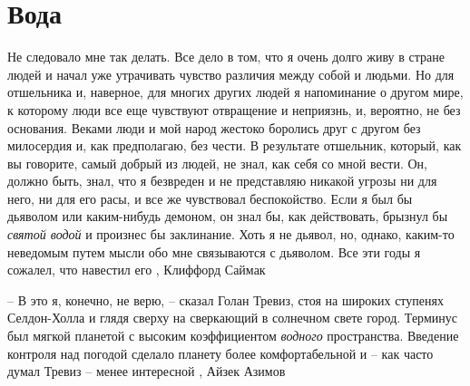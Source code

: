  
 
 
 
 
\chapter{Вода}

Не следовало мне так делать. Все дело в том, что я очень долго живу в стране
людей и начал уже утрачивать чувство различия между собой и людьми. Но для
отшельника и, наверное, для многих других людей я напоминание о другом мире, к
которому люди все еще чувствуют отвращение и неприязнь, и, вероятно, не без
основания. Веками люди и мой народ жестоко боролись друг с другом без
милосердия и, как предполагаю, без чести. В результате отшельник, который, как
вы говорите, самый добрый из людей, не знал, как себя со мной вести. Он, должно
быть, знал, что я безвреден и не представляю никакой угрозы ни для него, ни для
его расы, и все же чувствовал беспокойство. Если я был бы дьяволом или
каким-нибудь демоном, он знал бы, как действовать, брызнул бы \emph{святой водой} и
произнес бы заклинание. Хоть я не дьявол, но, однако, каким-то неведомым путем
мысли обо мне связываются с дьяволом. Все эти годы я сожалел, что навестил его
, Клиффорд Саймак

– В это я, конечно, не верю, – сказал Голан Тревиз, стоя на широких ступенях
Селдон-Холла и глядя сверху на сверкающий в солнечном свете город.  Терминус
был мягкой планетой с высоким коэффициентом \emph{водного} пространства.
Введение контроля над погодой сделало планету более комфортабельной и – как
часто думал Тревиз – менее интересной
, Айзек Азимов
